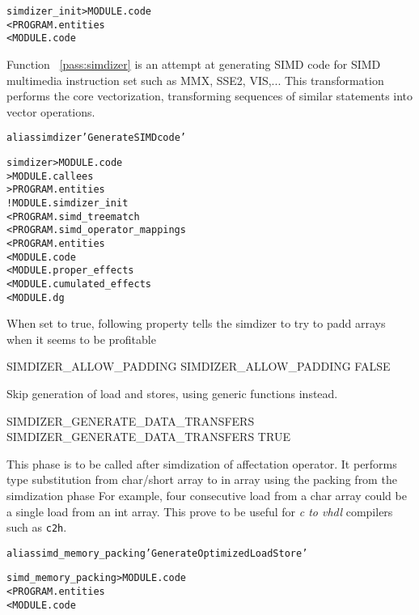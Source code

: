 \documentclass[a4paper]{report}
\newenvironment{PipsMake}{\begin{alltt}}{\end{alltt}}
\newcommand{\PipsPassRef}[1]{\texttt{\detokenize{#1}}~\ref{pass:#1}}
\newenvironment{PipsPass}[1]{\label{pass:#1}}{}
\begin{document}
\begin{PipsMake}
simdizer_init  > MODULE.code
	< PROGRAM.entities
	< MODULE.code
\end{PipsMake}

\begin{PipsPass}{simdizer}
Function \PipsPassRef{simdizer} is an attempt at generating SIMD code for SIMD
multimedia instruction set such as MMX, SSE2, VIS,... This
transformation performs the core vectorization, transforming sequences
of similar statements into vector operations.
\end{PipsPass}

\begin{PipsMake}
alias simdizer 'Generate SIMD code'

simdizer                    > MODULE.code
                            > MODULE.callees
                            > PROGRAM.entities
		! MODULE.simdizer_init
		< PROGRAM.simd_treematch
		< PROGRAM.simd_operator_mappings
        < PROGRAM.entities
        < MODULE.code
        < MODULE.proper_effects
        < MODULE.cumulated_effects
        < MODULE.dg
\end{PipsMake}

When set to true, following property tells the simdizer to try to padd arrays when it seems to be profitable
\begin{PipsProp}{SIMDIZER_ALLOW_PADDING}
SIMDIZER_ALLOW_PADDING FALSE
\end{PipsProp}

Skip generation of load and stores, using generic functions instead.
\begin{PipsProp}{SIMDIZER_GENERATE_DATA_TRANSFERS}
SIMDIZER_GENERATE_DATA_TRANSFERS TRUE
\end{PipsProp}

\begin{PipsPass}{simd_memory_packing}
This phase is to be called after simdization of affectation operator.
It performs type substitution from char/short array to in array
using the packing from the simdization phase
For example, four consecutive load from a char array could be a single load from an int array.
This prove to be useful for \textit{c to vhdl} compilers such as \texttt{c2h}.
\end{PipsPass}

\begin{PipsMake}
alias simd_memory_packing 'Generate Optimized Load Store'

simd_memory_packing  > MODULE.code
        < PROGRAM.entities
        < MODULE.code
\end{PipsMake}
\end{document}
